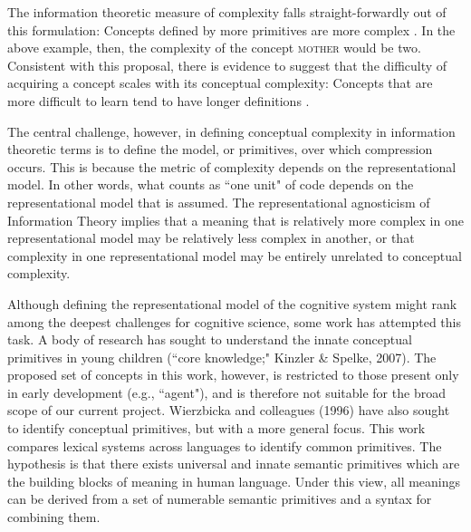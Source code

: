 The information theoretic measure of complexity falls straight-forwardly out of this formulation: Concepts defined by more primitives are more complex \cite{shepard1961learning,feldman2000minimization,goodman2008rational}. In the  above example, then, the complexity of the concept  \textsc{mother} would be two. Consistent with this proposal, there is evidence to suggest that the difficulty of acquiring a concept scales with its conceptual complexity: Concepts that are more difficult to learn tend to have longer definitions \cite{shepard1961learning,feldman2000minimization}.


The central challenge, however, in defining conceptual complexity in information theoretic terms is to define the model, or primitives, over which compression occurs. This is because the metric of complexity depends on the representational model. In other words, what counts as ``one unit" of code depends on the representational model that is assumed. The representational agnosticism of Information Theory implies that a meaning that is relatively more complex in one representational model may be relatively less complex in another, or that  complexity in one representational model may be entirely unrelated to conceptual complexity.

Although defining the representational model of the cognitive system might rank among the deepest challenges for cognitive science, some work has attempted this task. A body of research has sought to understand the innate conceptual primitives in young children (``core knowledge;" Kinzler \& Spelke, 2007). \nocite{kinzler2007core} The proposed set of concepts in this work, however, is restricted to those present only  in early development (e.g., ``agent"), and is therefore not suitable for the broad scope of our current project.  Wierzbicka and colleagues (1996) have also  sought  to identify conceptual primitives, but with a more general focus.  \nocite{wierzbicka1996semantics} This work compares lexical systems across languages  to identify common primitives. The hypothesis is that there exists universal and innate semantic primitives which are the building blocks of meaning in human language. Under this view, all meanings can be derived from a set of numerable semantic primitives and a syntax for combining them.

